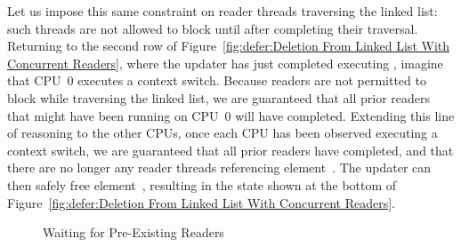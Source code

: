 Let us impose this same constraint on reader threads traversing the
linked list: such threads are not allowed to block until after
completing their traversal.
Returning to the second row of
Figure~\ref{fig:defer:Deletion From Linked List With Concurrent Readers},
where the updater has just completed executing ,
imagine that CPU~0 executes a context switch.
Because readers are not permitted to block while traversing the linked
list, we are guaranteed that all prior readers that might have been running on
CPU~0 will have completed.
Extending this line of reasoning to the other CPUs, once each CPU has
been observed executing a context switch, we are guaranteed that all
prior readers have completed, and that there are no longer any reader
threads referencing element~.
The updater can then safely free element~, resulting in the
state shown at the bottom of
Figure~\ref{fig:defer:Deletion From Linked List With Concurrent Readers}.

\begin{figure}[tb]
\begin{center}
\end{center}
\caption{Waiting for Pre-Existing Readers}
\label{fig:defer:Waiting for Pre-Existing Readers}
\end{figure}

